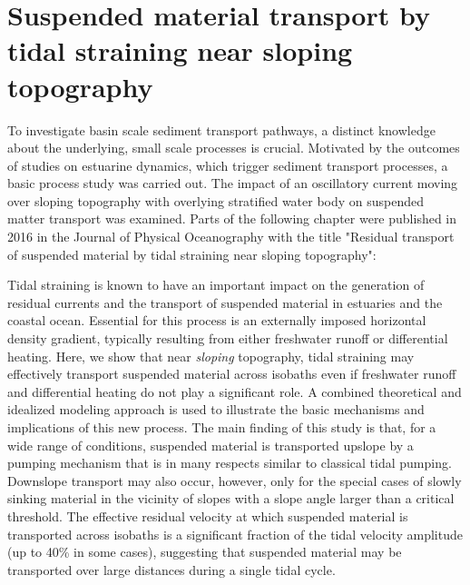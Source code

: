 \chapter{Suspended material transport by tidal straining
  near sloping topography}
\label{kap-slope}

To investigate basin scale sediment transport pathways, a distinct knowledge about the underlying, small scale processes is crucial. Motivated by the outcomes of studies on estuarine dynamics, which trigger sediment transport processes, a basic process study was carried out. The impact of an oscillatory current moving over sloping topography with overlying stratified water body on suspended matter transport was examined. Parts of the following chapter were published in 2016 in the Journal of Physical Oceanography with the title "Residual transport of suspended material by tidal straining near sloping topography":

Tidal straining is known to have an important impact on the
  generation of residual currents and the transport of suspended
  material in estuaries and the coastal ocean. Essential for this
  process is an externally imposed horizontal density gradient,
  typically resulting from either freshwater runoff or differential
  heating. Here, we show that near \emph{sloping} topography, tidal
  straining may effectively transport suspended material across
  isobaths even if freshwater runoff and differential heating do not
  play a significant role. A combined theoretical and idealized
  modeling approach is used to illustrate the basic mechanisms and
  implications of this new process. The main finding of this study is
  that, for a wide range of conditions, suspended material is
  transported upslope by a pumping mechanism that is in many respects
  similar to classical tidal pumping. Downslope transport may also
  occur, however, only for the special cases of slowly sinking
  material in the vicinity of slopes with a slope angle larger than a
  critical threshold. The effective residual velocity at which
  suspended material is transported across isobaths is a significant
  fraction of the tidal velocity amplitude (up to 40\% in some cases),
  suggesting that suspended material may be transported over large
  distances during a single tidal cycle. \citep{schulzumlauf2016}


